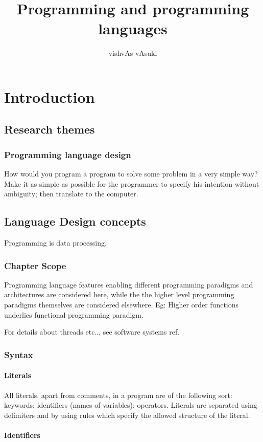 \documentclass[oneside, article]{memoir}
\title{Programming and programming languages}
\author{vishvAs vAsuki}
\begin{document}
\maketitle
\tableofcontents

\part{Introduction}
\chapter{Research themes}
\section{Programming language design}
How would you program a program to solve some problem in a very simple way? Make it as simple as possible for the programmer to specify his intention without ambiguity; then translate to the computer.

\chapter{Language Design concepts}
Programming is data processing.

\section{Chapter Scope}
Programming language features enabling different programming paradigms and architectures are considered here, while the the higher level programming paradigms themselves are considered elsewhere. Eg: Higher order functions underlies functional programming paradigm.

For details about threads etc.., see software systems ref.

\section{Syntax}
\subsection{Literals}
All literals, apart from comments, in a program are of the following sort: keywords; identifiers (names of variables); operators. Literals are separated using delimiters and by using rules which specify the allowed structure of the literal.

\subsection{Identifiers}
\end{document}
